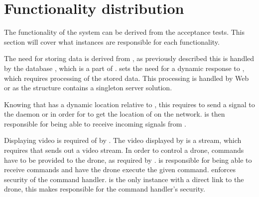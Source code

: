 \section{Functionality distribution}\label{sec:functionality_distrubution}

The functionality of the system can be derived from the acceptance tests.
This section will cover what instances are responsible for each functionality.

The need for storing data is derived from , as previously described this is handled by the database , which is a part of .
 sets the need for a dynamic response to , which requires processing of the stored data.
This processing is handled by Web or  as the structure contains a singleton server solution.

Knowing that  has a dynamic location relative to , this requires  to send a signal to the daemon or  in order for  to get the location of  on the network.
 is then responsible for being able to receive incoming signals from .

Displaying video is required of  by .
The video displayed by  is a stream, which requires that  sends out a video stream.
In order to control a drone, commands have to be provided to the drone, as required by .
 is responsible for being able to receive commands and have the drone execute the given command.
 enforces security of the command handler.
 is the only instance with a direct link to the drone, this makes  responsible for the command handler's security.





